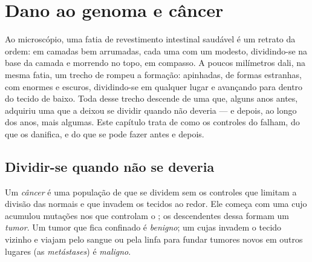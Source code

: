 \chapter{Dano ao genoma e câncer}\label{ch:g11:cancer}

Ao microscópio, uma fatia de revestimento intestinal saudável é um
retrato da ordem:  em camadas bem arrumadas, cada uma com um
 modesto, dividindo-se na base da camada e morrendo no topo, em
compasso. A poucos milímetros dali, na mesma fatia, um trecho de
 rompeu a formação: apinhadas, de formas estranhas, com 
enormes e escuros, dividindo-se em qualquer lugar e avançando para
dentro do tecido de baixo. Toda  desse trecho descende de uma
 que, alguns anos antes, adquiriu uma  que a deixou se
dividir quando não deveria --- e depois, ao longo dos anos, mais
algumas. Este capítulo trata de como os controles do 
falham, do que os danifica, e do que se pode fazer antes e depois.

\section{Dividir-se quando não se deveria}

\begin{definition}[Câncer]\label{def:g11:cancer:cancer}
Um \emph{câncer} é uma população de  que se
dividem sem os controles que limitam a divisão das  normais e
que invadem os tecidos ao redor. Ele começa com uma  cujo 
acumulou mutações nos  que controlam o ; os
descendentes dessa  formam um \emph{tumor}. Um tumor
que fica confinado é \emph{benigno}; um cujas  invadem o tecido
vizinho e viajam pelo sangue ou pela linfa para fundar tumores novos em
outros lugares (as \emph{metástases}) é \emph{maligno}.
\end{definition}

